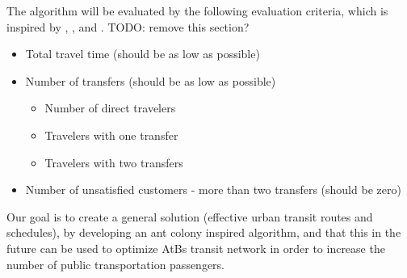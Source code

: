 The algorithm will be evaluated by the following evaluation criteria, which is inspired by \citep{kechagiopoulos14}, \citep{mandl80}, \citep{nikolic14} and \citep{fan09}. TODO: remove this section?
\begin{itemize}
\item Total travel time (should be as low as possible)
\item Number of transfers (should be as low as possible)
\begin{itemize}
\item Number of direct travelers 
\item Travelers with one transfer
\item Travelers with two transfers
\end{itemize}
\item Number of unsatisfied customers - more than two transfers (should be zero)
\end{itemize}

Our goal is to create a general solution (effective urban transit routes and schedules), by developing an ant colony inspired algorithm, and that this in the future can be used to optimize AtBs transit network in order to increase the number of public transportation passengers. 
